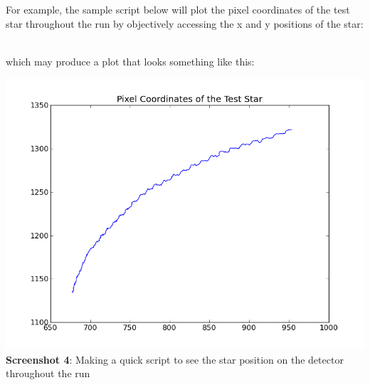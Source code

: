 \documentclass{article}
\begin{document}
For example, the sample script below will plot the pixel coordinates of the test star throughout the run by objectively accessing the x and y positions of the star: \\

{\addtolength{\leftskip}{10 mm}
{\scriptsize
\noindent {}\\

	}
}

\noindent which may produce a plot that looks something like this: \\

\begin{center}
\includegraphics[scale=0.5]{imgs/sample.png} \\
{\small \textbf{Screenshot 4}: Making a quick script to see the star position on the detector throughout the run}
\end{center}
\bigskip
\end{document}
